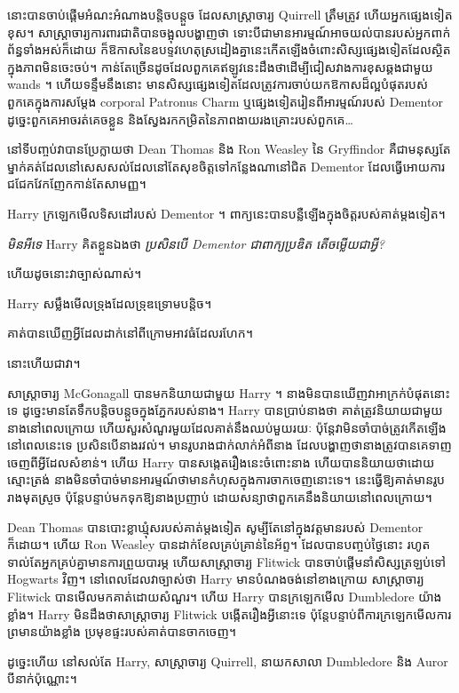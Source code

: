{នោះបានចាប់ផ្តើមអំណះអំណាងបន្តិចបន្តួច ដែលសាស្ត្រាចារ្យ Quirrell ត្រឹមត្រូវ ហើយអ្នកផ្សេងទៀតខុស។ សាស្ត្រាចារ្យការពារជាតិបានចង្អុលបង្ហាញថា ទោះបីជាមានអារម្មណ៍អាចយល់បានរបស់អ្នកពាក់ព័ន្ធទាំងអស់ក៏ដោយ ក៏ឱកាសនៃឧបទ្ទវហេតុស្រដៀងគ្នានេះកើតឡើងចំពោះសិស្សផ្សេងទៀតដែលស្ថិតក្នុងភាពមិនចេះចប់។ កាន់តែច្រើនដូចដែលពួកគេឥឡូវនេះដឹងថាដើម្បីជៀសវាងការខុសឆ្គងជាមួយ wands ។ ហើយទន្ទឹមនឹងនោះ មានសិស្សផ្សេងទៀតដែលត្រូវការចាប់យកឱកាសដ៏ល្អបំផុតរបស់ពួកគេក្នុងការសម្ដែង corporal Patronus Charm ឬផ្សេងទៀតរៀនពីអារម្មណ៍របស់ Dementor ដូច្នេះពួកគេអាចរត់គេចខ្លួន និងស្វែងរកកម្រិតនៃភាពងាយរងគ្រោះរបស់ពួកគេ…

នៅទីបញ្ចប់វាបានប្រែក្លាយថា Dean Thomas និង Ron Weasley នៃ Gryffindor គឺជាមនុស្សតែម្នាក់គត់ដែលនៅសេសសល់ដែលនៅតែសុខចិត្តទៅកន្លែងណានៅជិត Dementor ដែលធ្វើអោយការជជែកវែកញែកកាន់តែសាមញ្ញ។

Harry ក្រឡេកមើលទិសដៅរបស់ Dementor ។ ពាក្យនេះបានបន្លឺឡើងក្នុងចិត្តរបស់គាត់ម្តងទៀត។

\emph{មិនអីទេ} Harry គិតខ្លួនឯងថា \emph{ប្រសិនបើ Dementor ជាពាក្យប្រឌិត តើចម្លើយជាអ្វី?}

ហើយដូចនោះវាច្បាស់ណាស់។

Harry សម្លឹងមើលទ្រុងដែលទ្រុឌទ្រោមបន្តិច។

គាត់​បាន​ឃើញ​អ្វី​ដែល​ដាក់​នៅ​ពី​ក្រោម​អាវ​ធំ​ដែល​រហែក។

នោះហើយជាវា។

សាស្រ្តាចារ្យ McGonagall បានមកនិយាយជាមួយ Harry ។ នាង​មិន​បាន​ឃើញ​វា​អាក្រក់​បំផុត​នោះ​ទេ ដូច្នេះ​មាន​តែ​ទឹក​បន្តិច​បន្តួច​ក្នុង​ភ្នែក​របស់​នាង។ Harry បានប្រាប់នាងថា គាត់ត្រូវនិយាយជាមួយនាងនៅពេលក្រោយ ហើយសួរសំណួរមួយដែលគាត់នឹងឈប់មួយរយៈ ប៉ុន្តែវាមិនចាំបាច់ត្រូវកើតឡើងនៅពេលនេះទេ ប្រសិនបើនាងរវល់។ មានរូបរាងជាក់លាក់អំពីនាង ដែលបង្ហាញថានាងត្រូវបានគេទាញចេញពីអ្វីដែលសំខាន់។ ហើយ Harry បានសង្កេតរឿងនេះចំពោះនាង ហើយបាននិយាយថាដោយស្មោះត្រង់ នាងមិនចាំបាច់មានអារម្មណ៍ថាមានកំហុសក្នុងការចាកចេញនោះទេ។ នេះធ្វើឱ្យគាត់មានរូបរាងមុតស្រួច ប៉ុន្តែបន្ទាប់មកទុកឱ្យនាងប្រញាប់ ដោយសន្យាថាពួកគេនឹងនិយាយនៅពេលក្រោយ។

Dean Thomas បានបោះខ្លាឃ្មុំសរបស់គាត់ម្តងទៀត សូម្បីតែនៅក្នុងវត្តមានរបស់ Dementor ក៏ដោយ។ ហើយ Ron Weasley បានដាក់ខែលគ្រប់គ្រាន់នៃអ័ព្ទ។ ដែលបានបញ្ចប់ថ្ងៃនោះ រហូតទាល់តែអ្នកគ្រប់គ្នាមានការព្រួយបារម្ភ ហើយសាស្រ្តាចារ្យ Flitwick បានចាប់ផ្តើមនាំសិស្សត្រឡប់ទៅ Hogwarts វិញ។ នៅពេលដែលវាច្បាស់ថា Harry មានបំណងចង់នៅខាងក្រោយ សាស្រ្តាចារ្យ Flitwick បានមើលមកគាត់ដោយសំណួរ។ ហើយ Harry បានក្រឡេកមើល Dumbledore យ៉ាងខ្លាំង។ Harry មិនដឹងថាសាស្រ្តាចារ្យ Flitwick បង្កើតរឿងអ្វីនោះទេ ប៉ុន្តែបន្ទាប់ពីការក្រឡេកមើលការព្រមានយ៉ាងខ្លាំង ប្រមុខផ្ទះរបស់គាត់បានចាកចេញ។

ដូច្នេះហើយ នៅសល់តែ Harry, សាស្ត្រាចារ្យ Quirrell, នាយកសាលា Dumbledore និង Auror បីនាក់ប៉ុណ្ណោះ។

}

